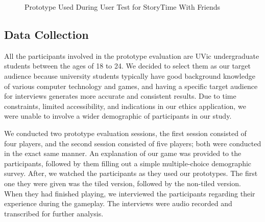 \documentclass{sigchi}
\begin{document}
\begin{figure}
\hfill
{}
\hfill
{}
\hfill
\caption{Prototype Used During User Test for StoryTime With Friends}
\label{fig:prototype}
\end{figure}



\subsection{Data Collection}
All the participants involved in the prototype evaluation are UVic undergraduate students between the ages of 18 to 24. We decided to select them as our target audience because university students typically have good background knowledge of various computer technology and games, and having a specific target audience for interviews generates more accurate and consistent results. Due to time constraints, limited accessibility, and indications in our ethics application, we were unable to involve a wider demographic of participants in our study. 

We conducted two prototype evaluation sessions, the first session consisted of four players, and the second session consisted of five players; both were conducted in the exact same manner. An explanation of our game was provided to the participants, followed by them filling out a simple multiple-choice demographic survey. After, we watched the participants as they used our prototypes. The first one they were given was the tiled version, followed by the non-tiled version. When they had finished playing, we interviewed the participants regarding their experience during the gameplay. The interviews were audio recorded and transcribed for further analysis.
\end{document}

